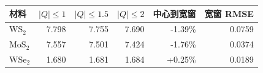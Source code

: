 \begin{tabular}{lrrrrr}
\toprule
材料 & $|Q|\leq1$ & $|Q|\leq1.5$ & $|Q|\leq2$ & 中心到宽窗 & 宽窗 RMSE \\
\midrule
WS$_2$ & 7.798 & 7.755 & 7.690 & -1.39\% & 0.0759 \\
MoS$_2$ & 7.557 & 7.501 & 7.424 & -1.76\% & 0.0374 \\
WSe$_2$ & 1.680 & 1.681 & 1.684 & +0.25\% & 0.0189 \\
\bottomrule
\end{tabular}
